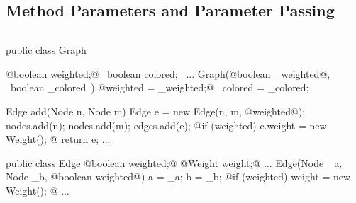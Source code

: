 \subsection{Method Parameters and Parameter Passing}
\begin{frame}[fragile]{\myframetitle}
		\begin{columns}
\begin{tiny}
\begin{codetight}{}
public class Graph {
	@boolean weighted;@
	~boolean colored;~
	...
	Graph(@boolean _weighted@, ~boolean _colored~) {
		@weighted = _weighted;@
		~colored = _colored;~
	}
	
	Edge add(Node n, Node m) {
		Edge e = new Edge(n, m, @weighted@);
		nodes.add(n); nodes.add(m); edges.add(e);
		@if (weighted) { e.weight = new Weight(); }@
		return e;
	}
	...
}
\end{codetight}
\begin{codetight}{}
public class Edge {
	@boolean weighted;@
	@Weight weight;@ 
	...
	Edge(Node _a, Node _b, @boolean weighted@) {
		a = _a; b = _b;
		@if (weighted) { weight = new Weight(); }@
	}
	...
}
\end{codetight}
\end{tiny}	
		\end{columns}
\end{frame}

